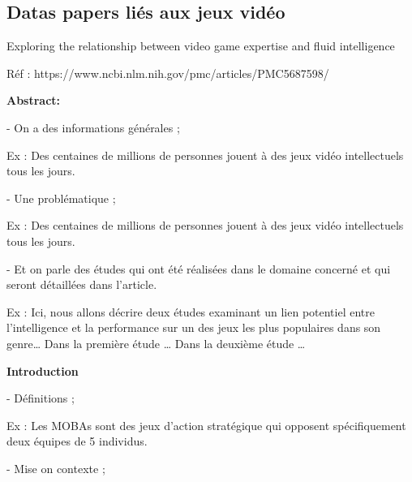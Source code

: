 \documentclass[11pt,oneside]{article}
\begin{document}
\subsection*{Datas papers liés aux jeux vidéo}
\begin{flushleft}
Exploring the relationship between video game expertise and fluid intelligence
\end{flushleft}

\begin{flushleft}
Réf : https://www.ncbi.nlm.nih.gov/pmc/articles/PMC5687598/
\end{flushleft}

\begin{flushleft}
\textbf{Abstract:}
\end{flushleft}

-	On a des informations générales ;

\begin{flushleft}
Ex : Des centaines de millions de personnes jouent à des jeux vidéo intellectuels tous les jours.
\end{flushleft}

-	Une problématique ;

\begin{flushleft}
Ex : Des centaines de millions de personnes jouent à des jeux vidéo intellectuels tous les jours.
\end{flushleft}

-	Et on parle des études qui ont été réalisées dans le domaine concerné et qui seront détaillées dans l’article.

\begin{flushleft}
Ex : Ici, nous allons décrire deux études examinant un lien potentiel entre l’intelligence et la performance sur un des jeux les plus populaires dans son genre… Dans la première étude … Dans la deuxième étude …
\end{flushleft}

\newpage

\begin{flushleft}
\textbf{Introduction}
\end{flushleft}

-	Définitions ;

\begin{flushleft}
Ex : Les MOBAs sont des jeux d’action stratégique qui opposent spécifiquement deux équipes de 5 individus.
\end{flushleft}

-	Mise on contexte ;
\end{document}

